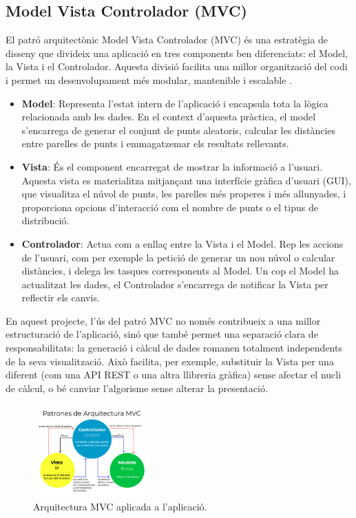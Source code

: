 \documentclass{ieeetj}
\begin{document}
\subsection{Model Vista Controlador (MVC)}
El patró arquitectònic Model Vista Controlador (MVC) és una estratègia de disseny que divideix una aplicació en tres components ben diferenciats: el Model, la Vista i el Controlador. Aquesta divisió facilita una millor organització del codi i permet un desenvolupament més modular, mantenible i escalable \cite{MVC_Theory}.

\begin{itemize}
    \item \textbf{Model}: Representa l'estat intern de l'aplicació i encapsula tota la lògica relacionada amb les dades. En el context d’aquesta pràctica, el model s'encarrega de generar el conjunt de punts aleatoris, calcular les distàncies entre parelles de punts i emmagatzemar els resultats rellevants.
    
    \item \textbf{Vista}: És el component encarregat de mostrar la informació a l'usuari. Aquesta vista es materialitza mitjançant una interfície gràfica d'usuari (GUI), que visualitza el núvol de punts, les parelles més properes i més allunyades, i proporciona opcions d’interacció com el nombre de punts o el tipus de distribució.
    
    \item \textbf{Controlador}: Actua com a enllaç entre la Vista i el Model. Rep les accions de l’usuari, com per exemple la petició de generar un nou núvol o calcular distàncies, i delega les tasques corresponents al Model. Un cop el Model ha actualitzat les dades, el Controlador s'encarrega de notificar la Vista per reflectir els canvis.
\end{itemize}

En aquest projecte, l’ús del patró MVC no només contribueix a una millor estructuració de l’aplicació, sinó que també permet una separació clara de responsabilitats: la generació i càlcul de dades romanen totalment independents de la seva visualització. Això facilita, per exemple, substituir la Vista per una diferent (com una API REST o una altra llibreria gràfica) sense afectar el nucli de càlcul, o bé canviar l’algorisme sense alterar la presentació.

\begin{figure}[htbp]
    \centerline{\includegraphics[width=0.4\textwidth]{png/mvc.png}}
    \caption{Arquitectura MVC aplicada a l’aplicació.}
    \label{fig:mvc-nuvol}
\end{figure}
\end{document}

